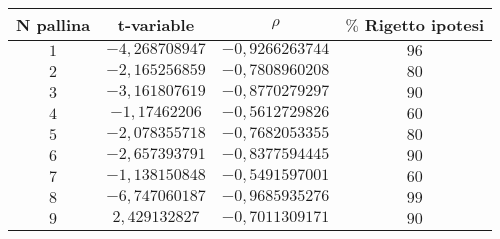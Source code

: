 \documentclass[a4paper,11pt,oneside]{article}
\begin{document}
\begin{table}[h!]
\centering
\begin{tabular}{|c|c|c|c|}
\hline
 \textbf{N pallina} & t-variable & \textbf{$\rho$} & \textbf{{$\%$ Rigetto ipotesi}} \\ \hline
\rowcolor[rgb]{0.85,0.85,0.85}$1$ & $-4,268708947$ & $-0,9266263744$ & $96$ \\ \hline
 $2$ & $-2,165256859$ & $-0,7808960208$ & $80$ \\ \hline
\rowcolor[rgb]{0.85,0.85,0.85}$3$ & $-3,161807619$ & $-0,8770279297$ & $90$ \\ \hline
 $4$ & $-1,17462206$ & $-0,5612729826$ & $60$ \\ \hline
\rowcolor[rgb]{0.85,0.85,0.85}$5$ & $-2,078355718$ & $-0,7682053355$ & $80$ \\ \hline
 $6$ & $-2,657393791$ & $-0,8377594445$ & $90$ \\ \hline
\rowcolor[rgb]{0.85,0.85,0.85}$7$ & $-1,138150848$ & $-0,5491597001$ & $60$ \\ \hline
 $8$ & $-6,747060187$ & $-0,9685935276$ & $99$ \\ \hline
\rowcolor[rgb]{0.85,0.85,0.85}$9$ & $2,429132827$ & $-0,7011309171$ & $90$ \\ \hline
\end{tabular}
\end{table}


\end{document}
